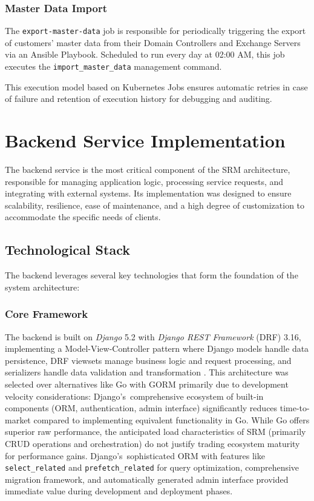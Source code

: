 \subsubsection{Master Data Import}
The \texttt{export-master-data} job is responsible for periodically triggering the export of customers' master data from their Domain Controllers and Exchange Servers via an Ansible Playbook. Scheduled to run every day at 02:00 AM, this job executes the \texttt{import\_master\_data} management command.

This execution model based on Kubernetes Jobs ensures automatic retries in case of failure and retention of execution history for debugging and auditing.

\section{Backend Service Implementation}
The backend service is the most critical component of the SRM architecture, responsible for managing application logic, processing service requests, and integrating with external systems. Its implementation was designed to ensure scalability, resilience, ease of maintenance, and a high degree of customization to accommodate the specific needs of clients.

\subsection{Technological Stack}

The backend leverages several key technologies that form the foundation of the system architecture:

\subsubsection{Core Framework}

The backend is built on \textit{Django} 5.2 with \textit{Django REST Framework} (DRF) 3.16, implementing a Model-View-Controller pattern where Django models handle data persistence, DRF viewsets manage business logic and request processing, and serializers handle data validation and transformation \cite{django}\cite{django_rest_framework}. This architecture was selected over alternatives like Go with GORM primarily due to development velocity considerations: Django's~comprehensive ecosystem of built-in components (ORM, authentication, admin interface) significantly reduces time-to-market compared to implementing equivalent functionality in Go. While Go offers superior raw performance, the anticipated load characteristics of SRM (primarily CRUD operations and orchestration) do not justify trading ecosystem maturity for performance gains. Django's~sophisticated ORM with features like \texttt{select\_related} and \texttt{prefetch\_related} for query optimization, comprehensive migration framework, and automatically generated admin interface provided immediate value during development and deployment phases.

